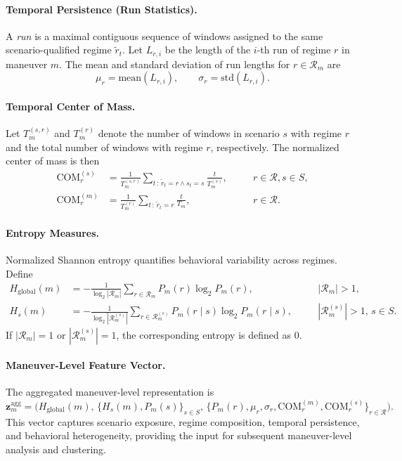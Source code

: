 \paragraph{Temporal Persistence (Run Statistics).}  
A \emph{run} is a maximal contiguous sequence of windows assigned to the same scenario-qualified regime $\tilde r_t$.  
Let $L_{r,i}$ be the length of the $i$-th run of regime $r$ in maneuver $m$. The mean and standard deviation of run lengths for $r \in \mathcal{R}_m$ are
\[
\mu_r = \mathrm{mean}(L_{r,i}), \qquad
\sigma_r = \mathrm{std}(L_{r,i}).
\]

\paragraph{Temporal Center of Mass.}  
Let $T_m^{(s,r)}$ and $T_m^{(r)}$ denote the number of windows in scenario $s$ with regime $r$ and the total number of windows with regime $r$, respectively.  
The normalized center of mass is then
\[
\begin{aligned}
	\text{COM}_r^{(s)} &= \frac{1}{T_m^{(s,r)}} \sum_{t \,:\, \tilde r_t = r \wedge s_t = s} \frac{t}{T_m^{(s)}}, &\quad & r \in \mathcal{R}, s \in S, \\
	\text{COM}_r^{(m)} &= \frac{1}{T_m^{(r)}} \sum_{t \,:\, \tilde r_t = r} \frac{t}{T_m}, &\quad & r \in \mathcal{R}.
\end{aligned}
\]




\paragraph{Entropy Measures.}  
Normalized Shannon entropy quantifies behavioral variability across regimes. Define
\[
\begin{aligned}
	H_\text{global}(m) &= -\frac{1}{\log_2 |\mathcal{R}_m|} \sum_{r \in \mathcal{R}_m} P_m(r) \log_2 P_m(r), &\quad &|\mathcal{R}_m|>1, \\
	H_s(m) &= -\frac{1}{\log_2 |\mathcal{R}_m^{(s)}|} \sum_{r \in \mathcal{R}_m^{(s)}} P_m(r \mid s) \log_2 P_m(r \mid s), &\quad &|\mathcal{R}_m^{(s)}|>1,\, s \in S.
\end{aligned}
\]
If $|\mathcal{R}_m|=1$ or $|\mathcal{R}_m^{(s)}|=1$, the corresponding entropy is defined as $0$.

\paragraph{Maneuver-Level Feature Vector.}  
The aggregated maneuver-level representation is
\[
\mathbf{z}_m^\text{agg} =
\Big(
H_\text{global}(m),\,
\{ H_s(m), P_m(s) \}_{s \in S},\,
\{ P_m(r), \mu_r, \sigma_r, \text{COM}_r^{(m)}, \text{COM}_r^{(s)} \}_{r \in \mathcal{R}}
\Big).
\]
This vector captures scenario exposure, regime composition, temporal persistence, and behavioral heterogeneity, providing the input for subsequent maneuver-level analysis and clustering.



